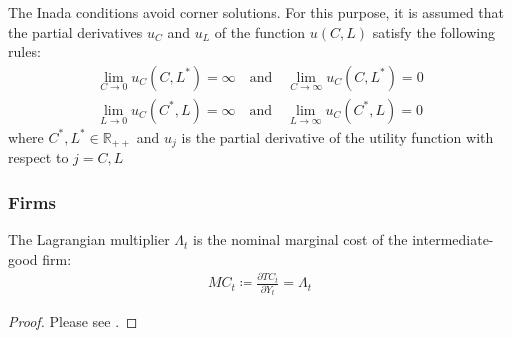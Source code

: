 \documentclass[
thesis.tex
]{subfiles}
\begin{document}

\begin{definition} \label{def:Inada Condition}
	The Inada conditions \cite{inada_two-sector_1963} avoid corner solutions. For this purpose, it is assumed that the partial derivatives $u_C$ and $u_L$ of the function $u(C, L)$ satisfy the following rules:
	\begin{align}
		\lim_{C\to 0} u_C(C,L^\ast) = \infty \quad \text{and} \quad
		\lim_{C\to \infty} u_C(C,L^\ast) = 0 \\
		\lim_{L\to 0} u_C(C^\ast,L) = \infty \quad \text{and} \quad
		\lim_{L\to \infty} u_C(C^\ast,L) = 0 \nonumber
	\end{align}
	where $C^\ast,L^\ast \in \mathbb{R}_{++}$ and $u_j$ is the partial derivative of the utility function with respect to $j=C,L$ \cite[Lecture 1, p.2]{solis-garcia_ucb_2022}
\end{definition}


\begin{definition}
	\cite[Lecture 4, p.4]{solis-garcia_ucb_2022}
\end{definition}


\subsubsection{Firms}


\begin{lemma}\label{lemma:marginal-cost}
	The Lagrangian multiplier $\Lambda_t$ is the nominal marginal cost of the intermediate-good firm:
	\begin{align}
		MC_t \coloneq \frac{\partial TC_t}{\partial Y_t} = \Lambda_t
	\end{align}
	
	\begin{proof}
		Please see \textcite[p.449]{simon_mathematics_1994}.
	\end{proof}
	
\end{lemma}
\end{document}

